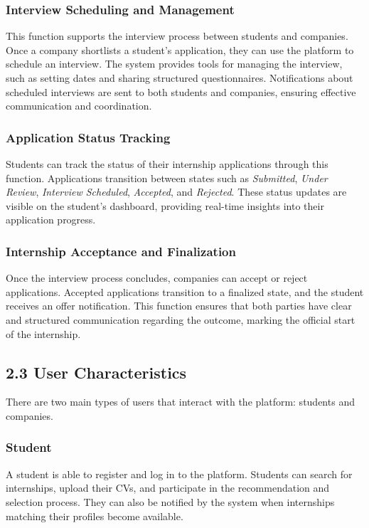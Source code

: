 \documentclass[12pt]{article}
\begin{document}
\subsubsection{Interview Scheduling and Management}
This function supports the interview process between students and companies. Once a company shortlists a student’s application, they can use the platform to schedule an interview. The system provides tools for managing the interview, such as setting dates and sharing structured questionnaires. Notifications about scheduled interviews are sent to both students and companies, ensuring effective communication and coordination.

\subsubsection{Application Status Tracking}
Students can track the status of their internship applications through this function. Applications transition between states such as \textit{Submitted}, \textit{Under Review}, \textit{Interview Scheduled}, \textit{Accepted}, and \textit{Rejected}. These status updates are visible on the student’s dashboard, providing real-time insights into their application progress. %

\subsubsection{Internship Acceptance and Finalization}
Once the interview process concludes, companies can accept or reject applications. Accepted applications transition to a finalized state, and the student receives an offer notification. This function ensures that both parties have clear and structured communication regarding the outcome, marking the official start of the internship.

\newpage

\subsection{2.3 User Characteristics}

There are two main types of users that interact with the platform: students and companies.

\subsubsection{Student}
A student is able to register and log in to the platform. Students can search for internships, upload their CVs, and participate in the recommendation and selection process. They can also be notified by the system when internships matching their profiles become available.
\end{document}
